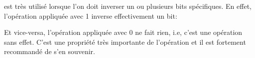 ﻿\XOR est très utilisé lorsque l'on doit inverser un ou plusieurs bits spécifiques.
En effet, l'opération \XOR appliquée avec 1 inverse effectivement un bit:



Et vice-versa, l'opération \XOR appliquée avec 0 ne fait rien, i.e, c'est une opération
sans effet.
C'est une propriété très importante de l'opération \XOR et il est fortement recommandé
de s'en souvenir.

